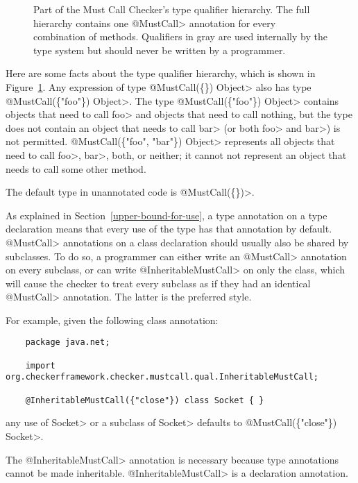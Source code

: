 \begin{figure}
\caption{Part of the Must Call Checker's type
qualifier hierarchy.  The full hierarchy contains one \<@MustCall> annotation
for every combination of methods.
Qualifiers in gray are used internally by the type system but should
never be written by a programmer.}
\label{fig-must-call-hierarchy}
\end{figure}

Here are some facts about the type qualifier hierarchy, which is shown in
Figure~\ref{fig-must-call-hierarchy}.
Any expression of type \<@MustCall(\{\}) Object> also has type
\<@MustCall(\{"foo"\}) Object>.
The type \<@MustCall(\{"foo"\}) Object>
contains objects that need to call \<foo> and objects that need to call
nothing, but the type does not contain an
object that needs to call \<bar> (or both \<foo> and \<bar>) is not permitted.
\<@MustCall(\{"foo", "bar"\}) Object> represents all objects that need to
call \<foo>, \<bar>, both, or neither; it cannot not represent an object that needs
to call some other method.

The default type in unannotated code is \<@MustCall(\{\})>.


As explained in Section~\ref{upper-bound-for-use}, a type
annotation on a type declaration means that every use of the type has that
annotation by default. \<@MustCall> annotations on a class declaration should
usually also be shared by subclasses. To do so, a programmer can either write
an \<@MustCall> annotation on every subclass, or can write \<@InheritableMustCall>
on only the class, which will cause the checker to treat every subclass as if
they had an identical \<@MustCall> annotation.  The latter is the preferred style.

For example, given the following class annotation:
\begin{Verbatim}
    package java.net;

    import org.checkerframework.checker.mustcall.qual.InheritableMustCall;

    @InheritableMustCall({"close"}) class Socket { }
\end{Verbatim}
any use of \<Socket> or a subclass of \<Socket> defaults to \<@MustCall(\{"close"\}) Socket>.

The \<@InheritableMustCall> annotation is necessary because type
annotations cannot be made inheritable.  \<@InheritableMustCall> is
a declaration annotation.


